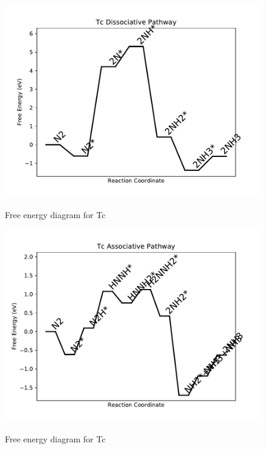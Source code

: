 \documentclass{article}
\begin{document}
\begin{figure}
\includegraphics[width=1\linewidth]{data/plots/Tc_dissociative.pdf}
\label{fig:Tc_dissociative}
\caption{Free energy diagram for Tc}
\end{figure}

\begin{figure}
\includegraphics[width=1\linewidth]{data/plots/Tc_associative.pdf}
\label{fig:Tc_associative}
\caption{Free energy diagram for Tc}
\end{figure}
\end{document}

